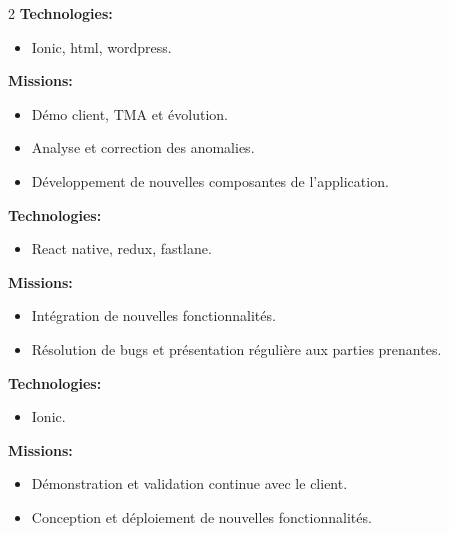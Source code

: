 \documentclass[10pt,a4paper,withhyper]{altacv}
\begin{document}
\begin{paracol}{2}
\textbf{Technologies:}
\begin{itemize}
	\addtolength{\itemindent}{0.1cm}
	\item Ionic, html, wordpress.
\end{itemize}

\divider


\textbf{Missions:}

\begin{itemize}
\addtolength{\itemindent}{0.1cm}
\item Démo client, TMA et évolution.
\item Analyse et correction des anomalies.
\item Développement de nouvelles composantes de l'application.

\end{itemize}

\textbf{Technologies:}

\begin{itemize}
	\addtolength{\itemindent}{0.1cm}
	\item React native, redux, fastlane.
	
\end{itemize}
\divider

\textbf{Missions:}

\begin{itemize}
	\addtolength{\itemindent}{0.1cm}
	\item Intégration de nouvelles fonctionnalités.
	\item Résolution de bugs et présentation régulière aux parties prenantes.
\end{itemize}

\textbf{Technologies:}	
\begin{itemize}
	\addtolength{\itemindent}{0.1cm}
	\item Ionic.
	
\end{itemize}
\divider


\textbf{Missions:}

\begin{itemize}
	\addtolength{\itemindent}{0.1cm}
	\item Démonstration et validation continue avec le client.
	\item Conception et déploiement de nouvelles fonctionnalités.
\end{itemize}


\end{paracol}
\end{document}
